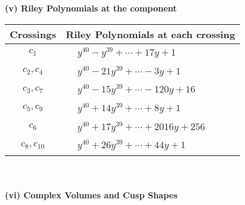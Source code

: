 \documentclass[1p]{elsarticle_modified}
\theoremstyle{definition}
\begin{document}
\newpage\renewcommand{\arraystretch}{1}
\flushleft \textbf{(v) Riley Polynomials at the component}\newline \\
\begin{tabular}{m{50pt}|m{274pt}}
Crossings & \hspace{64pt}Riley Polynomials at each crossing \\
\hline $$\begin{aligned}c_{1}\end{aligned}$$&$\begin{aligned}
&y^{40}- y^{39}+\cdots+17 y+1
\end{aligned}$\\
\hline $$\begin{aligned}c_{2},c_{4}\end{aligned}$$&$\begin{aligned}
&y^{40}-21 y^{39}+\cdots-3 y+1
\end{aligned}$\\
\hline $$\begin{aligned}c_{3},c_{7}\end{aligned}$$&$\begin{aligned}
&y^{40}-15 y^{39}+\cdots-120 y+16
\end{aligned}$\\
\hline $$\begin{aligned}c_{5},c_{9}\end{aligned}$$&$\begin{aligned}
&y^{40}+14 y^{39}+\cdots+8 y+1
\end{aligned}$\\
\hline $$\begin{aligned}c_{6}\end{aligned}$$&$\begin{aligned}
&y^{40}+17 y^{39}+\cdots+2016 y+256
\end{aligned}$\\
\hline $$\begin{aligned}c_{8},c_{10}\end{aligned}$$&$\begin{aligned}
&y^{40}+26 y^{39}+\cdots+44 y+1
\end{aligned}$\\
\hline
\end{tabular}\\~\\
\newpage\flushleft \textbf{(vi) Complex Volumes and Cusp Shapes}
\end{document}
